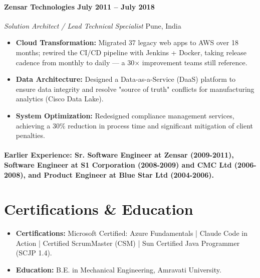 \documentclass[10pt, letterpaper]{article}
\begin{document}
\paragraph{\textbf{Zensar Technologies} \hfill July 2011 -- July 2018 \\}
\textit{Solution Architect / Lead Technical Specialist} \hfill Pune, India
\begin{itemize}[noitemsep, topsep=0pt]
    \item \textbf{Cloud Transformation:} Migrated 37 legacy web apps to AWS over 18 months; rewired the CI/CD pipeline with Jenkins + Docker, taking release cadence from monthly to daily — a 30× improvement teams still reference.
    \item \textbf{Data Architecture:} Designed a Data-as-a-Service (DaaS) platform to ensure data integrity and resolve "source of truth" conflicts for manufacturing analytics (Cisco Data Lake).
    \item \textbf{System Optimization:} Redesigned compliance management services, achieving a 30\% reduction in process time and significant mitigation of client penalties.
\end{itemize}

\paragraph{\textbf{Earlier Experience:} \textbf{Sr. Software Engineer} at Zensar (2009-2011), \textbf{Software Engineer} at S1 Corporation (2008-2009) and CMC Ltd (2006-2008), and \textbf{Product Engineer} at Blue Star Ltd (2004-2006).}

\section{Certifications \& Education}
\begin{itemize}[noitemsep, topsep=0pt]
    \item \textbf{Certifications:} Microsoft Certified: Azure Fundamentals | Claude Code in Action | Certified ScrumMaster (CSM) | Sun Certified Java Programmer (SCJP 1.4).
    \item \textbf{Education:} B.E. in Mechanical Engineering, Amravati University.
\end{itemize}
\end{document}
